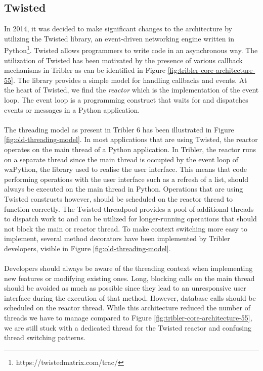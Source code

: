 \subsection{Twisted}
\label{subsec:architecture-twisted}
In 2014, it was decided to make significant changes to the architecture by utilizing the Twisted library, an event-driven networking engine written in Python\footnote{https://twistedmatrix.com/trac/}. Twisted allows programmers to write code in an asynchronous way. The utilization of Twisted has been motivated by the presence of various callback mechanisms in Tribler as can be identified in Figure \ref{fig:tribler-core-architecture-55}. The library provides a simple model for handling callbacks and events. At the heart of Twisted, we find the \emph{reactor} which is the implementation of the event loop\cite{twistedreactoroverview}. The event loop is a programming construct that waits for and dispatches events or messages in a Python application.\\\\
The threading model as present in Tribler 6 has been illustrated in Figure \ref{fig:old-threading-model}. In most applications that are using Twisted, the reactor operates on the main thread of a Python application. In Tribler, the reactor runs on a separate thread since the main thread is occupied by the event loop of wxPython, the library used to realise the user interface. This means that code performing operations with the user interface such as a refresh of a list, should always be executed on the main thread in Python. Operations that are using Twisted constructs however, should be scheduled on the reactor thread to function correctly. The Twisted threadpool provides a pool of additional threads to dispatch work to and can be utilized for longer-running operations that should not block the main or reactor thread. To make context switching more easy to implement, several method decorators have been implemented by Tribler developers, visible in Figure \ref{fig:old-threading-model}.\\\\
Developers should always be aware of the threading context when implementing new features or modifying existing ones. Long, blocking calls on the main thread should be avoided as much as possible since they lead to an unresponsive user interface during the execution of that method. However, database calls should be scheduled on the reactor thread. While this architecture reduced the number of threads we have to manage compared to Figure \ref{fig:tribler-core-architecture-55}, we are still stuck with a dedicated thread for the Twisted reactor and confusing thread switching patterns.


